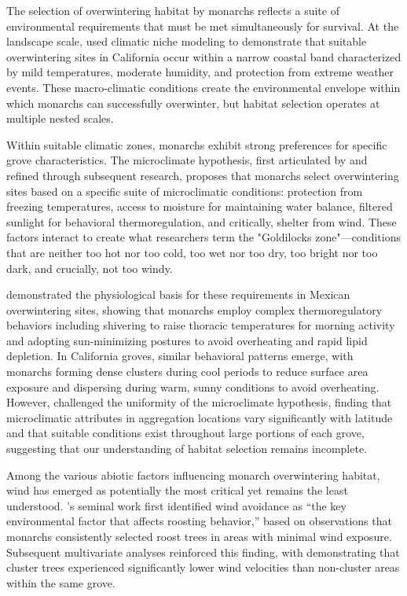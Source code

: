 The selection of overwintering habitat by monarchs reflects a suite of environmental requirements that must be met simultaneously for survival. At the landscape scale, \citet{fisherClimaticNicheModel2018} used climatic niche modeling to demonstrate that suitable overwintering sites in California occur within a narrow coastal band characterized by mild temperatures, moderate humidity, and protection from extreme weather events. These macro-climatic conditions create the environmental envelope within which monarchs can successfully overwinter, but habitat selection operates at multiple nested scales.

Within suitable climatic zones, monarchs exhibit strong preferences for specific grove characteristics. The microclimate hypothesis, first articulated by \citet{leongMicroenvironmentalFactorsAssociated1990a} and refined through subsequent research, proposes that monarchs select overwintering sites based on a specific suite of microclimatic conditions: protection from freezing temperatures, access to moisture for maintaining water balance, filtered sunlight for behavioral thermoregulation, and critically, shelter from wind. These factors interact to create what researchers term the "Goldilocks zone"---conditions that are neither too hot nor too cold, too wet nor too dry, too bright nor too dark, and crucially, not too windy.

\citet{Masters1988_ACNENTPT} demonstrated the physiological basis for these requirements in Mexican overwintering sites, showing that monarchs employ complex thermoregulatory behaviors including shivering to raise thoracic temperatures for morning activity and adopting sun-minimizing postures to avoid overheating and rapid lipid depletion. In California groves, similar behavioral patterns emerge, with monarchs forming dense clusters during cool periods to reduce surface area exposure and dispersing during warm, sunny conditions to avoid overheating. However, \citet{Saniee2022_3VN7I68M} challenged the uniformity of the microclimate hypothesis, finding that microclimatic attributes in aggregation locations vary significantly with latitude and that suitable conditions exist throughout large portions of each grove, suggesting that our understanding of habitat selection remains incomplete.

Among the various abiotic factors influencing monarch overwintering habitat, wind has emerged as potentially the most critical yet remains the least understood. \citet{leongMicroenvironmentalFactorsAssociated1990a}'s seminal work first identified wind avoidance as ``the key environmental factor that affects roosting behavior,'' based on observations that monarchs consistently selected roost trees in areas with minimal wind exposure. Subsequent multivariate analyses reinforced this finding, with \citet{leongUseMultivariateAnalyses1991} demonstrating that cluster trees experienced significantly lower wind velocities than non-cluster areas within the same grove.

